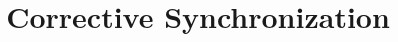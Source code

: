 \documentclass[preprint,nocopyrightspace]{sig-alternate-05-2015}
\theoremstyle{exampstyle}\newtheorem{theorem}{Theorem}[section]
\theoremstyle{exampstyle}\newtheorem{lemma}[theorem]{Lemma}
\theoremstyle{exampstyle}\newtheorem{proposition}[theorem]{Proposition}
\theoremstyle{exampstyle}\newtheorem{corollary}[theorem]{Corollary}
\theoremstyle{exampstyle}\newtheorem{definition}{Definition}[section]
\theoremstyle{exampstyle}\newtheorem{parameter}{Parameter}[section]
\theoremstyle{exampstyle}\newtheorem{property}{Property}[section]
\theoremstyle{exampstyle}\newtheorem{example}[equation]{Example}
\theoremstyle{exampstyle}\newtheorem{algorithm}[theorem]{Algorithm}
\begin{document}
	
	
	
%	
%	
%	
	
	
	\title{Corrective Synchronization}
	
	\author{
	}
	
\end{document}

